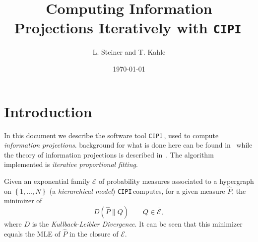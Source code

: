 \documentclass[12pt]{amsart}
\newcommand{\set}[1]{\left\lbrace #1 \right\rbrace} %
\newcommand{\comm}[1]{ }
\newcommand{\cipi}{\texttt{CIPI}\,}
\theoremstyle{plain}%
\theoremstyle{definition}
\theoremstyle{remark}
\begin{document}
\title[CIPI]{Computing Information Projections Iteratively with \cipi}

\author{L. Steiner and T. Kahle}
\address{Max Planck Institute for Mathematics in the Sciences, Inselstrasse 22, D-04103 Leipzig, Germany}

\date{\today}

\comm{
\begin{abstract}
  some abstract\ldots
\end{abstract}
}

\maketitle

\section{Introduction}
In this document we describe the software tool \cipi, used to compute \emph{information
  projections}. background for what is done here can be found in~\cite{KahleDiplom06} while the
theory of information projections is described in~\cite{csiszarshields04}. The algorithm implemented
is \emph{iterative proportional fitting}.

Given an exponential family $\mathcal{E}$ of probability measures associated to a hypergraph on
$\set{1,\ldots,N}$ (a \emph{hierarchical model}) \cipi computes, for a given measure $\hat{P}$, the
minimizer of
\begin{equation*}
  D(\hat{P}\parallel Q) \qquad Q\in\overline{\mathcal{E}}, 
\end{equation*} where $D$ is the \emph{Kullback-Leibler Divergence}. It can be seen that this
minimizer equals the MLE of $\hat{P}$ in the closure of $\mathcal{E}$.
\end{document}
